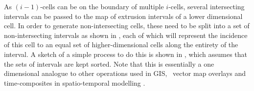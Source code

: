 As $(i-1)$-cells can be on the boundary of multiple $i$-cells, several intersecting intervals can be passed to the map of extrusion intervals of a lower dimensional cell.
In order to generate non-intersecting cells, these need to be split into a set of non-intersecting intervals as shown in , each of which will represent the incidence of this cell to an equal set of higher-dimensional cells along the entirety of the interval.
A sketch of a simple process to do this is shown in , which assumes that the sets of intervals are kept sorted.
Note that this is essentially a one dimensional analogue to other operations used in GIS, \eg\ vector map overlays \citep[\S{}2.3]{deBerg08} and time-composites in spatio-temporal modelling \citep{Langran88}.
